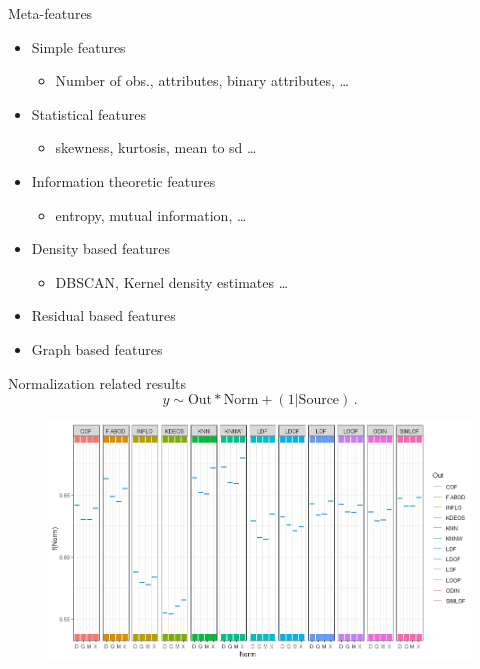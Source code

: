 \documentclass{beamer}
\begin{document}
\begin{darkframes}
    \begin{frame}{Meta-features}
        \begin{itemize}
            \item Simple features 
            \begin{itemize}
                \item Number of obs., attributes, binary attributes, \ldots
            \end{itemize}
            \item Statistical features
            \begin{itemize}
                \item skewness, kurtosis, mean to sd \ldots
            \end{itemize}
            \item Information theoretic features
              \begin{itemize}
                \item entropy, mutual information,  \ldots
            \end{itemize}
            \item Density based features
              \begin{itemize}
                \item DBSCAN, Kernel density estimates \ldots
            \end{itemize}
            \item Residual based features
            \item Graph based features
        \end{itemize}
    \end{frame}
 	
 	
    \begin{frame}{Normalization related results}
    \begin{equation*}
	y \sim  \text{Out} * \text{Norm} + (1|\text{Source}) \, .
\end{equation*}
    \begin{figure}\includegraphics[scale=0.4]{fit3_Norm_Effect_By_Out.jpeg}
    \end{figure}
    \end{frame}	
 		

\end{darkframes}
\end{document}

